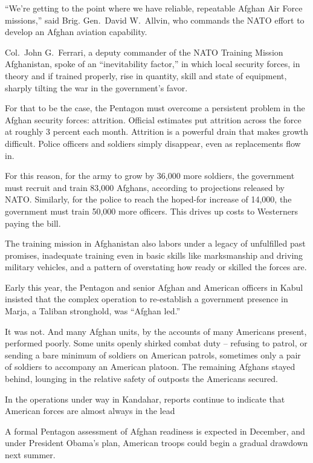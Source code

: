 ﻿\documentclass[12pt]{article}
\begin{document}
``We're getting to the point where we have reliable, repeatable Afghan Air Force missions,'' said
Brig. Gen.~David W.~Allvin, who commands the NATO effort to develop an Afghan aviation capability.

Col.~John G.~Ferrari, a deputy commander of the NATO Training Mission Afghanistan, spoke of an
``inevitability factor,'' in which local security forces, in theory and if trained properly, rise in
quantity, skill and state of equipment, sharply tilting the war in the government's favor.

For that to be the case, the Pentagon must overcome a persistent problem in the Afghan security
forces: attrition. Official estimates put attrition across the force at roughly 3 percent each
month. Attrition is a powerful drain that makes growth difficult. Police officers and soldiers
simply disappear, even as replacements flow in.

For this reason, for the army to grow by 36,000 more soldiers, the government must recruit and train
83,000 Afghans, according to projections released by NATO. Similarly, for the police to reach the
hoped-for increase of 14,000, the government must train 50,000 more officers. This drives up costs
to Westerners paying the bill.

The training mission in Afghanistan also labors under a legacy of unfulfilled past promises,
inadequate training even in basic skills like marksmanship and driving military vehicles, and a
pattern of overstating how ready or skilled the forces are.

Early this year, the Pentagon and senior Afghan and American officers in Kabul insisted that the
complex operation to re-establish a government presence in Marja, a Taliban stronghold, was ``Afghan
led.''

It was not. And many Afghan units, by the accounts of many Americans present, performed poorly. Some
units openly shirked combat duty -- refusing to patrol, or sending a bare minimum of soldiers on
American patrols, sometimes only a pair of soldiers to accompany an American platoon. The remaining
Afghans stayed behind, lounging in the relative safety of outposts the Americans secured.

In the operations under way in Kandahar, reports continue to indicate that American forces are
almost always in the lead

A formal Pentagon assessment of Afghan readiness is expected in December, and under President
Obama's plan, American troops could begin a gradual drawdown next summer.
\end{document}

